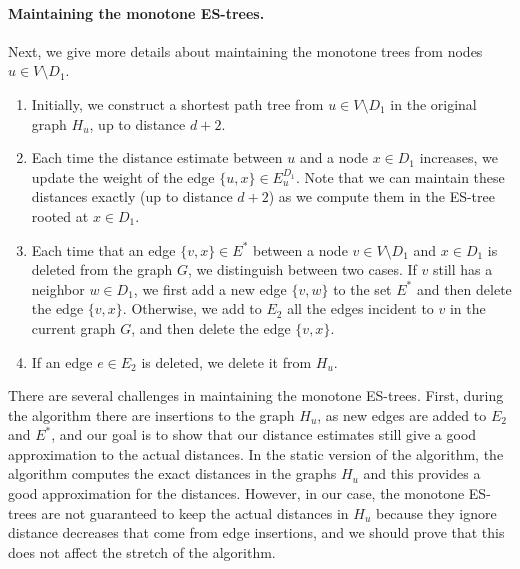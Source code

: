 \paragraph{Maintaining the monotone ES-trees.}
Next, we give more details about maintaining the monotone trees from nodes $u \in V \setminus D_1$.
\begin{enumerate}
    \item Initially, we construct a shortest path tree from $u \in V \setminus D_1$ in the original graph $H_u$, up to distance $d+2$.
    \item Each time the distance estimate between $u$ and a node $x \in D_1$ increases, we update the weight of the edge $\{u,x\} \in E^{D_1}_u$. Note that we can maintain these distances exactly (up to distance $d+2$) as we compute them in the ES-tree rooted at $x \in D_1$.\label{step_dom}
    \item Each time that an edge $\{v,x\} \in E^*$ between a node $v \in V \setminus D_1$ and $x \in D_1$ is deleted from the graph $G$, we distinguish between two cases. If $v$ still has a neighbor $w \in D_1$, we first add a new edge $\{v,w\}$ to the set $E^*$ and then delete the edge $\{v,x\}$.%
    Otherwise, we add to $E_2$ all the edges incident to $v$ in the current graph $G$, and then delete the edge $\{v,x\}$.\label{step_E*_ES-tree}
    \item If an edge $e \in E_2$ is deleted, we delete it from $H_u$.
\end{enumerate}

There are several challenges in maintaining the monotone ES-trees. First, during the algorithm there are insertions to the graph $H_u$, as new edges are added to $E_2$ and $E^*$, and our goal is to show that our distance estimates still give a good approximation to the actual distances. In the static version of the algorithm, the algorithm computes the exact distances in the graphs $H_u$ and this provides a good approximation for the distances. However, in our case, the monotone ES-trees are not guaranteed to keep the actual distances in $H_u$ because they ignore distance decreases that come from edge insertions, and we should prove that this does not affect the stretch of the algorithm. 

